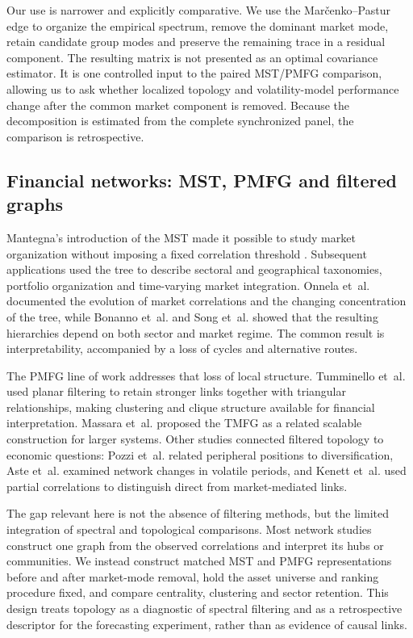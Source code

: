 Our use is narrower and explicitly comparative. We use the Mar\v{c}enko--Pastur edge to organize the empirical spectrum, remove the dominant market mode, retain candidate group modes and preserve the remaining trace in a residual component. The resulting matrix is not presented as an optimal covariance estimator. It is one controlled input to the paired MST/PMFG comparison, allowing us to ask whether localized topology and volatility-model performance change after the common market component is removed. Because the decomposition is estimated from the complete synchronized panel, the comparison is retrospective.

\subsection{Financial networks: MST, PMFG and filtered graphs}

Mantegna's introduction of the MST made it possible to study market organization without imposing a fixed correlation threshold \cite{mantegna_1999_hierarchical}. Subsequent applications used the tree to describe sectoral and geographical taxonomies, portfolio organization and time-varying market integration. Onnela et~al. \cite{onnela_2003_dynamics} documented the evolution of market correlations and the changing concentration of the tree, while Bonanno et~al. \cite{bonanno_2004_networks} and Song et~al. \cite{song_2012_evolution} showed that the resulting hierarchies depend on both sector and market regime. The common result is interpretability, accompanied by a loss of cycles and alternative routes.

The PMFG line of work addresses that loss of local structure. Tumminello et~al. \cite{tumminello_2005_tool,tumminello_2010_correlation} used planar filtering to retain stronger links together with triangular relationships, making clustering and clique structure available for financial interpretation. Massara et~al. \cite{massara_2016_tmfg} proposed the TMFG as a related scalable construction for larger systems. Other studies connected filtered topology to economic questions: Pozzi et~al. \cite{pozzi_2013_spread} related peripheral positions to diversification, Aste et~al. \cite{aste_2010_correlation} examined network changes in volatile periods, and Kenett et~al. \cite{kenett_2012_dominating} used partial correlations to distinguish direct from market-mediated links.

The gap relevant here is not the absence of filtering methods, but the limited integration of spectral and topological comparisons. Most network studies construct one graph from the observed correlations and interpret its hubs or communities. We instead construct matched MST and PMFG representations before and after market-mode removal, hold the asset universe and ranking procedure fixed, and compare centrality, clustering and sector retention. This design treats topology as a diagnostic of spectral filtering and as a retrospective descriptor for the forecasting experiment, rather than as evidence of causal links.

